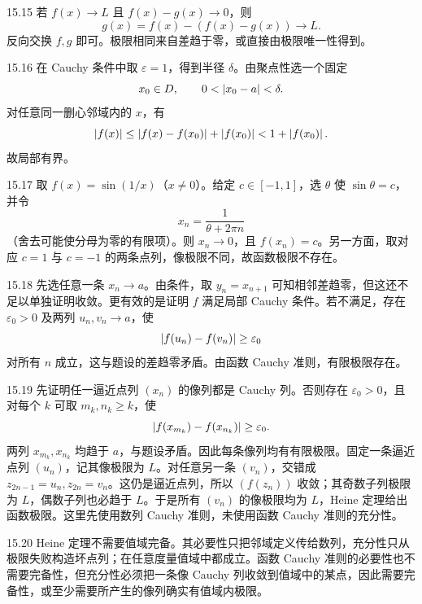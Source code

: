 \begin{solution}{15.15}
若 \(f(x)\to L\) 且 \(f(x)-g(x)\to0\)，则
\[
 g(x)=f(x)-(f(x)-g(x))\to L.
\]
反向交换 \(f,g\) 即可。极限相同来自差趋于零，或直接由极限唯一性得到。
\end{solution}

\begin{solution}{15.16}
在 Cauchy 条件中取 \(\varepsilon=1\)，得到半径 \(\delta\)。由聚点性选一个固定
\[
 x_0\in D,\qquad0<\left|x_0-a\right|<\delta.
\]
对任意同一删心邻域内的 \(x\)，有
\[
 \left|f(x)\right|\le\left|f(x)-f(x_0)\right|+\left|f(x_0)\right|
 <1+\left|f(x_0)\right|.
\]
故局部有界。
\end{solution}

\begin{solution}{15.17}
取 \(f(x)=\sin(1/x)\)（\(x\ne0\)）。给定 \(c\in[-1,1]\)，选 \(\theta\) 使 \(\sin\theta=c\)，并令
\[
 x_n=\frac1{\theta+2\pi n}
\]
（舍去可能使分母为零的有限项）。则 \(x_n\to0\)，且 \(f(x_n)=c\)。另一方面，取对应 \(c=1\) 与 \(c=-1\) 的两条点列，像极限不同，故函数极限不存在。
\end{solution}

\begin{solution}{15.18}
先选任意一条 \(x_n\to a\)。由条件，取 \(y_n=x_{n+1}\) 可知相邻差趋零，但这还不足以单独证明收敛。更有效的是证明 \(f\) 满足局部 Cauchy 条件。若不满足，存在 \(\varepsilon_0>0\) 及两列 \(u_n,v_n\to a\)，使
\[
 \left|f(u_n)-f(v_n)\right|\ge\varepsilon_0
\]
对所有 \(n\) 成立，这与题设的差趋零矛盾。由函数 Cauchy 准则，有限极限存在。
\end{solution}

\begin{solution}{15.19}
先证明任一逼近点列 \((x_n)\) 的像列都是 Cauchy 列。否则存在 \(\varepsilon_0>0\)，且对每个 \(k\) 可取 \(m_k,n_k\ge k\)，使
\[
 \left|f(x_{m_k})-f(x_{n_k})\right|\ge\varepsilon_0.
\]
两列 \(x_{m_k},x_{n_k}\) 均趋于 \(a\)，与题设矛盾。因此每条像列均有有限极限。固定一条逼近点列 \((u_n)\)，记其像极限为 \(L\)。对任意另一条 \((v_n)\)，交错成 \(z_{2n-1}=u_n,z_{2n}=v_n\)。这仍是逼近点列，所以 \((f(z_n))\) 收敛；其奇数子列极限为 \(L\)，偶数子列也必趋于 \(L\)。于是所有 \((v_n)\) 的像极限均为 \(L\)，Heine 定理给出函数极限。这里先使用数列 Cauchy 准则，未使用函数 Cauchy 准则的充分性。
\end{solution}

\begin{solution}{15.20}
Heine 定理不需要值域完备。其必要性只把邻域定义传给数列，充分性只从极限失败构造坏点列；在任意度量值域中都成立。函数 Cauchy 准则的必要性也不需要完备性，但充分性必须把一条像 Cauchy 列收敛到值域中的某点，因此需要完备性，或至少需要所产生的像列确实有值域内极限。
\end{solution}

